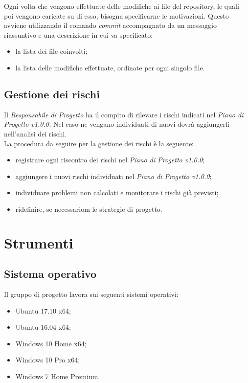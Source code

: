 \documentclass[./../NomeDocumento.tex]{subfiles}
\begin{document}
	Ogni volta che vengono effettuate delle modifiche ai file del repository, le quali poi vengono caricate su di esso, bisogna specificarne le motivazioni. Questo avviene utilizzando il comando \textit{commit} accompagnato da un messaggio riassuntivo e una descrizione in cui va specificato: 
	\begin{itemize}
		\item la lista dei file coinvolti;
		\item la lista delle modifiche effettuate, ordinate per ogni singolo file.
	\end{itemize}
	\subsection{Gestione dei rischi}
	
	Il \textit{Responsabile di Progetto} ha il compito di rilevare i rischi indicati nel \textit{Piano di Progetto v1.0.0.} Nel caso ne vengano individuati di nuovi dovrà aggiungerli nell'analisi dei rischi. 
	\\ \noindent La procedura da seguire per la gestione dei rischi è la seguente:
	\begin{itemize}
		\item registrare ogni riscontro dei rischi nel \textit{Piano di Progetto v1.0.0};
		\item aggiungere i nuovi rischi individuati nel \textit{Piano di Progetto v1.0.0};
		\item individuare problemi non calcolati e monitorare i rischi già previsti;
		\item ridefinire, se necessariom le strategie di progetto.
	\end{itemize}
	
	\section{Strumenti}
	
	\subsection{Sistema operativo}
	
	Il gruppo di progetto lavora sui seguenti sistemi operativi:
	\begin{itemize}
		\item Ubuntu 17.10 x64;
		\item Ubuntu 16.04  x64;
		\item Windows 10 Home x64;
		\item Windows 10 Pro x64;
		\item Windows 7 Home Premium.
	\end{itemize}
	
\end{document}
